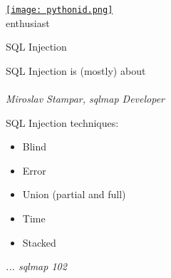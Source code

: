 \documentclass[xcolor=pdftex,table,10pt]{beamer}
\begin{document}
\begin{frame}
	\frametitle{}
	\begin{center}
		\href{http://www.python.or.id}{\texttt{[image: pythonid.png]}} \\
		enthusiast \\
	\end{center}
\end{frame}

\begin{frame}
	\begin{center}
		\LARGE{SQL Injection}
	\end{center}
\end{frame}


\begin{frame}
	\begin{center}
		\large{SQL Injection is (mostly) about \\ \color{red}{the unauthorized DBMS data access}}\\
		\small{\textit{Miroslav Stampar, sqlmap Developer}}
	\end{center}
\end{frame}

\begin{frame}
	\begin{center}
		\LARGE{SQL Injection techniques:}	
	\end{center}
	\begin{itemize}
		\item Blind
		\item Error
		\item Union (partial and full)
		\item Time
		\item Stacked
	\end{itemize}
	\begin{flushright}\small{\textit{... sqlmap 102}}\end{flushright}
\end{frame}

\end{document}
